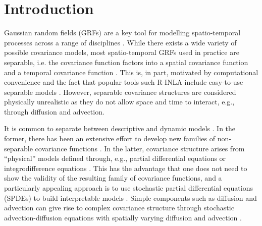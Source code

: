 \documentclass[12pt]{article} %
\begin{document}
\maketitle



\section{Introduction}\label{sec1}
Gaussian random fields (GRFs) are a key tool for modelling spatio-temporal processes across a range of disciplines \citep{gelfand2010handbook,cressie2011statistics}.
While there exists a wide variety of possible covariance models, most spatio-temporal GRFs used in practice are separable, i.e. the covariance function factors into a spatial covariance function and a temporal covariance function \citep{porcu202130}. This is, in part, motivated by  computational convenience and the fact that popular tools such R-INLA include easy-to-use separable models \citep{bakka2018spatial}. However, separable covariance structures are considered physically unrealistic as they do not allow space and time to interact, e.g., through diffusion and advection.

It is common to separate between descriptive and dynamic models \citep{cressie2011statistics}. In the former, there has been an extensive effort to develop new families of non-separable covariance functions \citep{cressie1999classes,gneiting2002nonseparable, stein2005space,rodrigues2010class,fonseca2011general}. In the latter, covariance structure arises from ``physical'' models defined through, e.g., partial differential equations or integrodifference equations \citep{wikle2010general,wikle2015modern}. This has the advantage that one does not need to show the validity of the resulting family of covariance functions, and a particularly appealing approach is to use stochastic partial differential equations (SPDEs) to build interpretable models  \citep{jones1997models,roques2022spatial}. Simple components such as diffusion and advection can give rise to complex covariance structure through stochastic advection-diffusion equations with spatially varying diffusion and advection \citep{lindgren2011,sigrist2015stochastic,liu2022statistical,clarotto2024spde,berild2024non}. 
\end{document}
